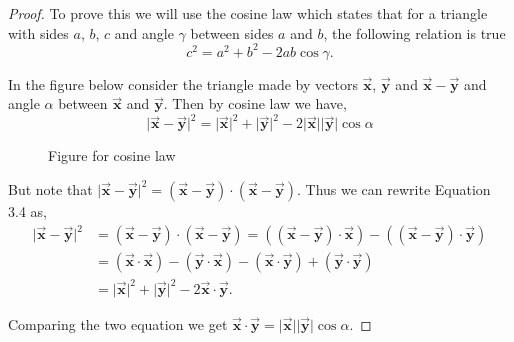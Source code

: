 \documentclass[12pt]{article}
\theoremstyle{remark}
\let\oldvec = \vec
\renewcommand{\vec}[1]{\oldvec{\mathbf{#1}}}
\numberwithin{equation}{section}
\begin{document}
\begin{proof}
    To prove this we will use the cosine law which states that for a triangle with sides $ a $, $ b $, $ c $ and angle $ \gamma $ between sides $ a $ and $ b $, the following relation is true
    \[ c^2 = a^2 + b^2 - 2ab\cos{\gamma}. \] 

    In the figure below consider the triangle made by vectors $ \vec{x} $, $ \vec{y} $ and $ \vec{x} - \vec{y} $ and angle $ \alpha $ between $ \vec{x} $ and $ \vec{y} $. Then by cosine law we have,
    \begin{equation}
	    \lvert \vec{x}-\vec{y} \rvert^{2} = \lvert \vec{x} \rvert^{2} + \lvert \vec{y} \rvert^{2} - 2 \lvert \vec{x} \rvert \lvert \vec{y} \rvert \cos{\alpha}
    \end{equation}
    

\begin{figure}[htp]
	\centering
	\caption{Figure for cosine law}
\end{figure}

But note that $ \lvert \vec{x} - \vec{y} \rvert^{2} = (\vec{x} - \vec{y}) \cdot (\vec{x} - \vec{y}) $. Thus we can rewrite Equation 3.4 as, 
\begin{align}
	\lvert \vec{x} - \vec{y} \rvert^{2} &= (\vec{x} - \vec{y}) \cdot (\vec{x} - \vec{y}) %
	 = ((\vec{x} - \vec{y}) \cdot \vec{x}) - ((\vec{x} - \vec{y}) \cdot \vec{y}) \\ 
					    &= (\vec{x} \cdot \vec{x}) - (\vec{y} \cdot \vec{x}) %
					     - (\vec{x} \cdot \vec{y}) + (\vec{y} \cdot \vec{y}) \\
					    &= \lvert \vec{x} \rvert^2 + \lvert \vec{y} \rvert^2 - 2 \vec{x} \cdot \vec{y}. 
\end{align}

Comparing the two equation we get $ \vec{x} \cdot \vec{y} = \lvert \vec{x} \rvert \lvert \vec{y} \rvert \cos{\alpha} $.

\end{proof}




\end{document}
